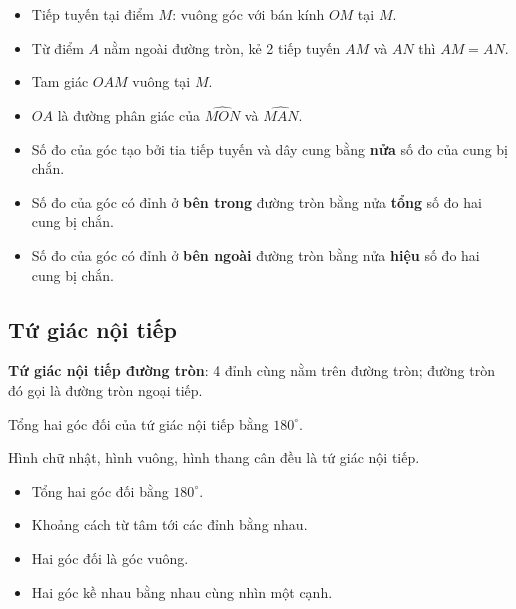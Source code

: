 \documentclass[12pt,a4paper]{article}
\begin{document}
\begin{tinhchat}
  \begin{itemize}
    \item Tiếp tuyến tại điểm $M$: vuông góc với bán kính $OM$ tại $M$.
    \item Từ điểm $A$ nằm ngoài đường tròn, kẻ 2 tiếp tuyến $AM$ và $AN$ thì $AM = AN$.
    \item Tam giác $OAM$ vuông tại $M$.
    \item $OA$ là đường phân giác của $\widehat{MON}$ và $\widehat{MAN}$.
  \end{itemize}
\end{tinhchat}

\begin{tinhchat}[title={Góc tạo bởi tiếp tuyến, dây cung và các góc liên quan}]
  \begin{itemize}
    \item Số đo của góc tạo bởi tia tiếp tuyến và dây cung bằng \textbf{nửa} số đo của cung bị chắn.
    \item Số đo của góc có đỉnh ở \textbf{bên trong} đường tròn bằng nửa \textbf{tổng} số đo hai cung bị chắn.
    \item Số đo của góc có đỉnh ở \textbf{bên ngoài} đường tròn bằng nửa \textbf{hiệu} số đo hai cung bị chắn.
  \end{itemize}
\end{tinhchat}

\subsection{Tứ giác nội tiếp}

\begin{dinhnghia}
  \textbf{Tứ giác nội tiếp đường tròn}: 4 đỉnh cùng nằm trên đường tròn; đường tròn đó gọi là đường tròn ngoại tiếp.
\end{dinhnghia}

\begin{tinhchat}
  Tổng hai góc đối của tứ giác nội tiếp bằng $180^\circ$.
\end{tinhchat}

\begin{vidu}
  Hình chữ nhật, hình vuông, hình thang cân đều là tứ giác nội tiếp.
\end{vidu}

\begin{phuongphap}[title={Chứng minh tứ giác nội tiếp}]
  \begin{itemize}
    \item Tổng hai góc đối bằng $180^\circ$.
    \item Khoảng cách từ tâm tới các đỉnh bằng nhau.
    \item Hai góc đối là góc vuông.
    \item Hai góc kề nhau bằng nhau cùng nhìn một cạnh.
  \end{itemize}
\end{phuongphap}
\end{document}
